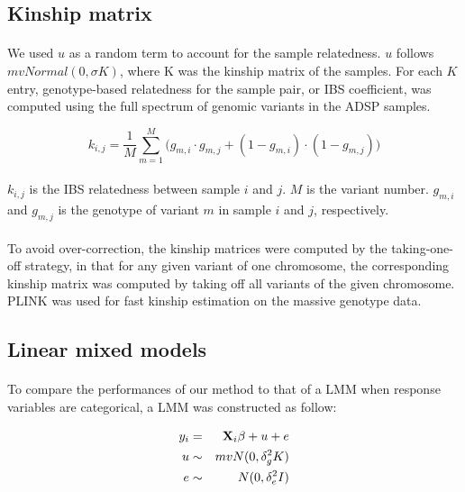 \documentclass[12pt]{article}
\begin{document}
\subsection*{Kinship matrix}

\paragraph{}{
We used $u$ as a random term to account for the sample relatedness. $u$ follows $mvNormal(0, \sigma K)$, where K was the kinship matrix of the samples. For each $K$ entry, genotype-based relatedness for the sample pair, or IBS coefficient, was computed using the full spectrum of genomic variants in the ADSP samples.
}

\begin{equation}
k_{i, j}  = \frac{1}{M} \sum_{m = 1}^M ({g_{m, i}  \cdot g_{m, j} + (1 - g_{m, i}) \cdot (1 - g_{m, j}))}
\end{equation}

\paragraph{}{
$k_{i, j}$ is the IBS relatedness between sample $i$ and $j$. $M$ is the variant number. $g_{m, i}$ and $g_{m, j}$ is the genotype of variant $m$ in sample $i$ and $j$, respectively.
}

\paragraph{}{
To avoid over-correction, the kinship matrices were computed by the taking-one-off strategy, in that for any given variant of one chromosome, the corresponding kinship matrix was computed by taking off all variants of the given chromosome. PLINK was used for fast kinship estimation on the massive genotype data.
}

\subsection*{Linear mixed models}

\paragraph{}{
To compare the performances of our method to that of a LMM when response variables are categorical, a LMM was constructed as follow: 
}

\begin{eqnarray}
   y_i & = &  \bold{X}_i \beta + u + e \\
   u & \sim & mvN(0, \delta^2_g K) \\
   e & \sim & N(0, \delta^2_e I)
\end{eqnarray}
\end{document}
